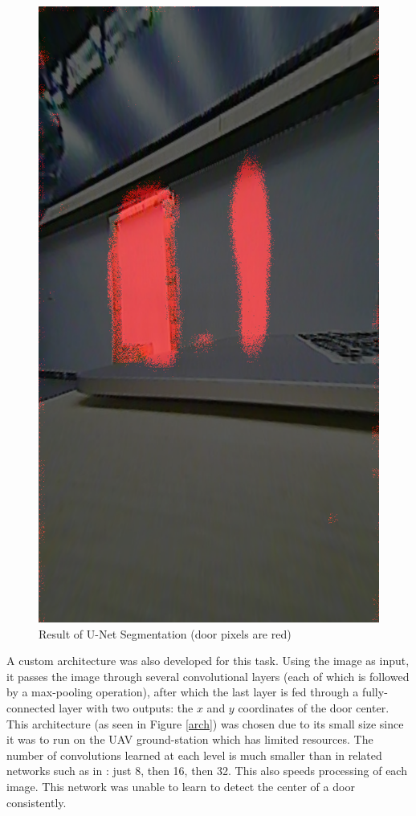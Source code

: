 \documentclass[12pt]{article}
\begin{document}
\begin{figure}
	\centering
	\includegraphics[scale=0.25, angle=270]{Unet_output}
	\vspace{10pt}
    \caption[Result of U-Net Segmentation]{Result of U-Net Segmentation (door pixels are red)}
	\label{Unet_output}
\end{figure}

A custom architecture was also developed for this task. Using the image as input, it passes the image through several convolutional layers (each of which is followed by a max-pooling operation), after which the last layer is fed through a fully-connected layer with two outputs: the $x$ and $y$ coordinates of the door center. This architecture (as seen in Figure \ref{arch}) was chosen due to its small size since it was to run on the UAV ground-station which has limited resources. The number of convolutions learned at each level is much smaller than in related networks such as in \cite{NNDoor}: just 8, then 16, then 32. This also speeds processing of each image. This network was unable to learn to detect the center of a door consistently. 
\end{document}
